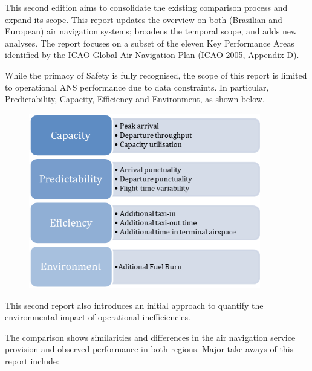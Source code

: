 \documentclass[
  a4paper,
  DIV=11,
  numbers=noendperiod]{scrreprt}
\begin{document}
This second edition aims to consolidate the existing comparison process
and expand its scope. This report updates the overview on both
(Brazilian and European) air navigation systems; broadens the temporal
scope, and adds new analyses. The report focuses on a subset of the
eleven Key Performance Areas identified by the ICAO Global Air
Navigation Plan (ICAO 2005, Appendix D).

While the primacy of Safety is fully recognised, the scope of this
report is limited to operational ANS performance due to data
constraints. In particular, Predictability, Capacity, Efficiency and
Environment, as shown below.

\begin{figure}[h]

{\centering \includegraphics[width=0.9\textwidth,height=\textheight]{././figures/KPA-and-KPI.png}

}

\end{figure}

This second report also introduces an initial approach to quantify the
environmental impact of operational inefficiencies.

The comparison shows similarities and differences in the air navigation
service provision and observed performance in both regions. Major
take-aways of this report include:
\end{document}
